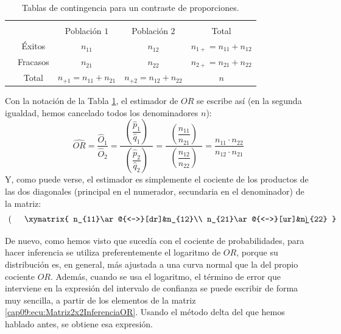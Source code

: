 \begin{table}[ht]
        \begin{center}
        \begin{tabular}{cc|c|c|c|}
              &\multicolumn{1}{c}{}&\multicolumn{3}{c}{}\\
              \cline{3-5}
               &\multicolumn{1}{c|}{}& Población $1$&  Población $2$ & Total \\
               \cline{2-5}
        &\multicolumn{1}{|c|}{Éxitos}& $n_{11}$ & $n_{12}$ & $n_{1+}=n_{11}+n_{12}$ \\ %
              \cline{2-5}
             & \multicolumn{1}{|c|}{Fracasos}& $n_{21}$ & $n_{22}$ &  $n_{2+}=n_{21}+n_{22}$\\ %
              \cline{2-5}
             & \multicolumn{1}{|c|}{Total} & $n_{+1}=n_{11}+n_{21}$ & $n_{+2}=n_{12}+n_{22}$ & $n$ \\
              \cline{2-5}
        \end{tabular}
        \end{center}
\caption{Tablas de contingencia para un contraste de proporciones.}
\label{cap09:tabla:notacionTablaContingenciaContrasteProporciones}
\end{table}
Con la notación de la Tabla \ref{cap09:tabla:notacionTablaContingenciaContrasteProporciones}, el estimador de $OR$ se escribe así (en la segunda igualdad, hemos cancelado todos los denominadores $n$):
\begin{equation}
\label{cap09:ecu:EstimadorMuestralORconTablaContingencia}
\widehat{OR}=\dfrac{\hat O_1}{\hat O_2}=
\dfrac{\phantom{a}\left(\dfrac{\hat p_1}{\hat q_1}\right)\phantom{a}}
{\left(\dfrac{\hat p_2}{\hat q_2}\right)}=
\dfrac{\phantom{a}\left(\dfrac{n_{11}}{n_{21}}\right)\phantom{a}}
{\left(\dfrac{n_{12}}{n_{22}}\right)}=\dfrac{n_{11}\cdot n_{22}}{n_{12}\cdot n_{21}}
\end{equation}
Y, como puede verse, el estimador es simplemente el cociente de los productos de las dos diagonales (principal en el numerador, secundaria en el denominador) de la matriz:
\begin{equation}
\label{cap09:ecu:Matriz2x2InferenciaOR}
\left(
\vcenter{
\xymatrix{
n_{11}\ar@{<->}[dr]&n_{12}\\
n_{21}\ar@{<->}[ur]&n_{22}
}
}
\right)
\end{equation}

De nuevo, como hemos visto que sucedía con el cociente de probabilidades, para hacer inferencia se utiliza preferentemente el logaritmo de $OR$, porque su distribución es, en general, más ajustada a una curva normal que la del propio cociente $OR$. Además, cuando se usa el logaritmo, el término de error que interviene en la expresión del intervalo de confianza se puede escribir de forma muy sencilla, a partir de los elementos de la matriz  \ref{cap09:ecu:Matriz2x2InferenciaOR}. Usando el método delta del que hemos hablado antes, se obtiene esa expresión.


